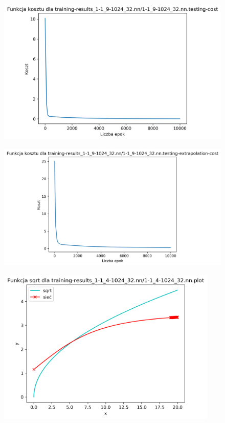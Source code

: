 \documentclass{classrep}
\begin{document}
{{{\begin{figure}[!htbp]
                \end{figure}
                \begin{figure}[!htbp]
                    \centering
                    \includegraphics[width=120mm]{wykresy/1-1_9-1024_32_nn_testing-cost.png}
                \end{figure}
                \begin{figure}[!htbp]
                    \centering
                    \includegraphics[width=140mm]{wykresy/1-1_9-1024_32_nn_testing-extrapolation-cost.png}
                \end{figure}
                \FloatBarrier
                \begin{figure}[!htbp]
                    \centering
                    \includegraphics[width=105mm]{wykresy/1-1_4-1024_32_nn_plot.png}

\end{figure}}}}
\end{document}
